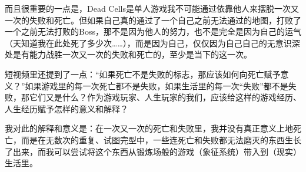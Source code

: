 而且很重要的一点是，Dead Cells是单人游戏\pozhehao{}我不可能通过依靠他人来摆脱一次又一次的失败和死亡。但如果自己真的通过了一个自己之前无法通过的地图，打败了一个之前无法打败的Boss，那不是因为他人的努力，也不是完全是因为自己的运气（天知道我在此处死了多少次……），而是因为自己，仅仅因为自己\pozhehao{}自己的无意识深处是有能力战胜一次又一次的失败和死亡的，至少是当下的这一次。

短视频里还提到了一点：“如果死亡不是失败的标志，那应该如何向死亡赋予意义？”如果游戏里的每一次死亡都不是失败，如果生活里的每一次“失败”都不是失败，那它们又是什么？作为游戏玩家、人生玩家的我们，应该给这样的游戏经历、人生经历赋予怎样的意义和解释？

我对此的解释和意义是：在一次又一次的死亡和失败里，我并没有真正意义上地死亡，而是在无数次的重复、试图完型中，一些连死亡和失败都无法磨灭的东西生长了出来，而我可以尝试将这个东西从锻炼场般的游戏（象征系统）带入到（现实）生活里。

